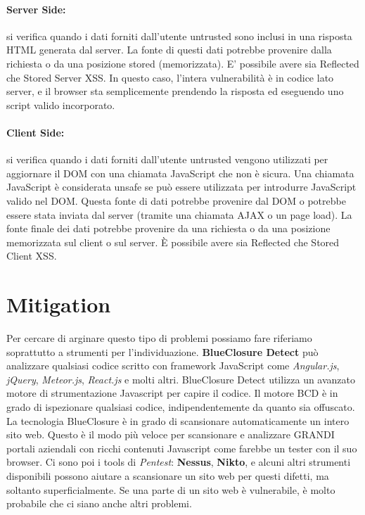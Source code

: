 \paragraph{Server Side: } si verifica quando i dati forniti
dall'utente untrusted sono inclusi in una
risposta HTML generata dal server. La
fonte di questi dati potrebbe provenire dalla
richiesta o da una posizione stored
(memorizzata).
E' possibile avere sia Reflected che Stored
Server XSS.
In questo caso, l'intera vulnerabilità è in
codice lato server, e il browser sta
semplicemente prendendo la risposta ed
eseguendo uno script valido incorporato.

\paragraph{Client Side: } si verifica quando i dati forniti
dall'utente untrusted vengono utilizzati per
aggiornare il DOM con una chiamata
JavaScript che non è sicura. Una chiamata
JavaScript è considerata unsafe se può
essere utilizzata per introdurre JavaScript
valido nel DOM.
Questa fonte di dati potrebbe
provenire dal DOM o potrebbe essere stata
inviata dal server (tramite una chiamata
AJAX o un page load). La fonte finale dei
dati potrebbe provenire da una richiesta o
da una posizione memorizzata sul client o
sul server.
È possibile avere sia Reflected che Stored
Client XSS.

\section{Mitigation}

Per cercare di arginare questo tipo di problemi
possiamo fare riferiamo soprattutto a strumenti per l'individuazione.
\textbf{BlueClosure Detect} può analizzare qualsiasi codice scritto con framework
JavaScript come
\textit{Angular.js}, \textit{jQuery}, \textit{Meteor.js}, \textit{React.js} e
molti altri. BlueClosure Detect utilizza un avanzato
motore di strumentazione Javascript per capire il codice. Il motore BCD è in grado
di
ispezionare qualsiasi codice, indipendentemente da quanto sia offuscato.
La tecnologia BlueClosure è in grado di scansionare automaticamente un intero sito
web.
Questo è il modo più veloce per scansionare e analizzare GRANDI portali aziendali
con
ricchi contenuti Javascript come farebbe un tester con il suo browser.
Ci sono poi i tools di \textit{Pentest}: \textbf{Nessus}, \textbf{Nikto}, e alcuni
altri strumenti disponibili possono
aiutare a scansionare un sito web per questi difetti, ma soltanto superficialmente.
Se una
parte di un sito web è vulnerabile, è molto probabile che ci siano anche altri
problemi.\\

